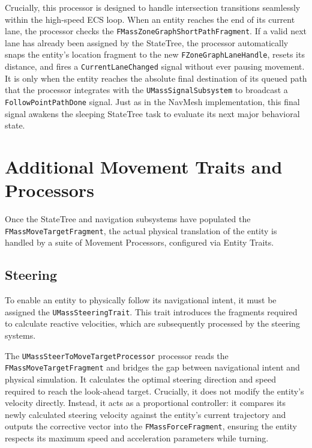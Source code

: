 Crucially, this processor is designed to handle intersection transitions seamlessly within the high-speed ECS loop. When an entity reaches the end of its current lane, the processor checks the \texttt{FMassZoneGraphShortPathFragment}. If a valid next lane has already been assigned by the StateTree, the processor automatically snaps the entity's location fragment to the new \texttt{FZoneGraphLaneHandle}, resets its distance, and fires a \texttt{CurrentLaneChanged} signal without ever pausing movement. It is only when the entity reaches the absolute final destination of its queued path that the processor integrates with the \texttt{UMassSignalSubsystem} to broadcast a \texttt{FollowPointPathDone} signal. Just as in the NavMesh implementation, this final signal awakens the sleeping StateTree task to evaluate its next major behavioral state.

\section{Additional Movement Traits and Processors}

Once the StateTree and navigation subsystems have populated the \newline\texttt{FMassMoveTargetFragment}, the actual physical translation of the entity is handled by a suite of Movement Processors, configured via Entity Traits.

\subsection{Steering}

To enable an entity to physically follow its navigational intent, it must be assigned the \texttt{UMassSteeringTrait}. This trait introduces the fragments required to calculate reactive velocities, which are subsequently processed by the steering systems.

The \texttt{UMassSteerToMoveTargetProcessor} processor reads the \newline\texttt{FMassMoveTargetFragment} and bridges the gap between navigational intent and physical simulation. It calculates the optimal steering direction and speed required to reach the look-ahead target. Crucially, it does not modify the entity's velocity directly. Instead, it acts as a proportional controller: it compares its newly calculated steering velocity against the entity's current trajectory and outputs the corrective vector into the \texttt{FMassForceFragment}, ensuring the entity respects its maximum speed and acceleration parameters while turning.

